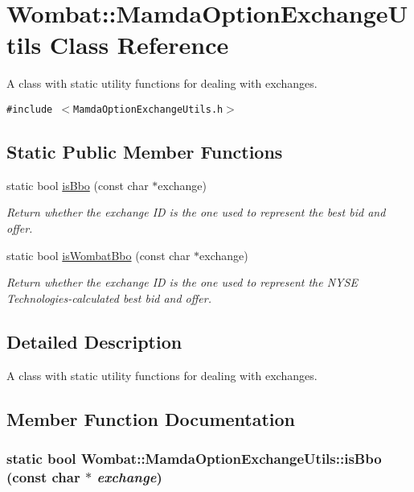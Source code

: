 \hypertarget{classWombat_1_1MamdaOptionExchangeUtils}{
\section{Wombat::Mamda\-Option\-Exchange\-Utils Class Reference}
\label{classWombat_1_1MamdaOptionExchangeUtils}
}
A class with static utility functions for dealing with exchanges.  


{\tt \#include $<$Mamda\-Option\-Exchange\-Utils.h$>$}

\subsection*{Static Public Member Functions}
\begin{CompactItemize}
\item 
static bool \hyperlink{classWombat_1_1MamdaOptionExchangeUtils_89d3ef764dcabfffcd30bf19a4716ef0}{is\-Bbo} (const char $\ast$exchange)
\begin{CompactList}\small\item\em Return whether the exchange ID is the one used to represent the best bid and offer. \item\end{CompactList}\item 
static bool \hyperlink{classWombat_1_1MamdaOptionExchangeUtils_f667d49e25e581cd95a39b1fda2802c1}{is\-Wombat\-Bbo} (const char $\ast$exchange)
\begin{CompactList}\small\item\em Return whether the exchange ID is the one used to represent the NYSE Technologies-calculated best bid and offer. \item\end{CompactList}\end{CompactItemize}


\subsection{Detailed Description}
A class with static utility functions for dealing with exchanges. 



\subsection{Member Function Documentation}
\hypertarget{classWombat_1_1MamdaOptionExchangeUtils_89d3ef764dcabfffcd30bf19a4716ef0}{
\subsubsection[isBbo]{\setlength{\rightskip}{0pt plus 5cm}static bool Wombat::Mamda\-Option\-Exchange\-Utils::is\-Bbo (const char $\ast$ {\em exchange})}}
\label{classWombat_1_1MamdaOptionExchangeUtils_89d3ef764dcabfffcd30bf19a4716ef0}


